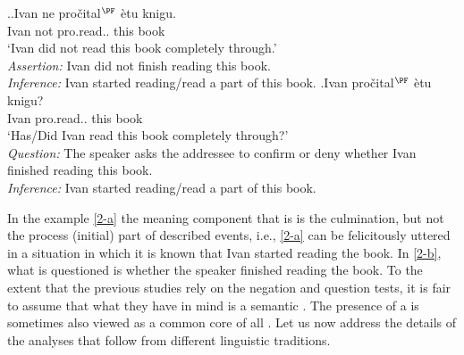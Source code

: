 \ex.\label{2}\ag.\label{2-a}Ivan ne pro\v{c}ital$^{\PF}$ \`{e}tu knigu.\\
Ivan not pro.read.. this book\\
\trans `Ivan did not read this book completely through.'\\
\textit{Assertion:} Ivan did not finish reading this book.\\
\textit{Inference:} Ivan started reading/read a part of this book.
\bg.\label{2-b}Ivan pro\v{c}ital$^{\PF}$ \`{e}tu knigu?\\
Ivan pro.read.. this book\\
\trans `Has/Did Ivan read this book completely through?'\\
\textit{Question:} The speaker asks the addressee to confirm or deny whether Ivan finished reading this book.\\
\textit{Inference:} Ivan started reading/read a part of this book.

In the example \ref{2-a} the meaning component that is  is the culmination, but not the process (initial) part of described events, i.e., \ref{2-a} can be felicitously uttered in a situation in which it is known that Ivan started reading the book. In \ref{2-b}, what is questioned is whether the speaker finished reading the book. To the extent that the previous studies rely on the negation and question tests, it is fair to assume that what they have in mind is a semantic . The presence of a  is sometimes \citep[e.g., by][]{Paducheva:96, Romanova:04} also viewed as a common core of all . Let us now address the details of the analyses that follow from different linguistic traditions.



